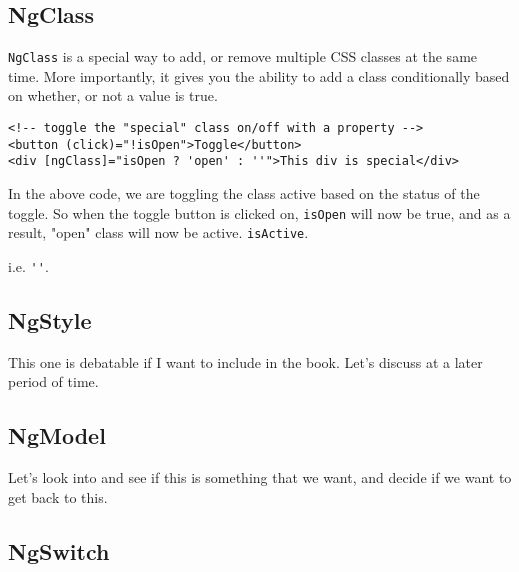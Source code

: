 \subsection{NgClass}
\lstinline{NgClass} is a special way to add, or remove multiple CSS classes 
at the same time. More importantly, it gives you the ability to add a class 
conditionally based on whether, or not a value is true. 
\begin{lstlisting}
<!-- toggle the "special" class on/off with a property -->
<button (click)="!isOpen">Toggle</button>
<div [ngClass]="isOpen ? 'open' : ''">This div is special</div>
\end{lstlisting}

In the above code, we are toggling the class active based on the status of 
the toggle. So when the toggle button is clicked on, \lstinline{isOpen} will 
now be true, and as a result, "open" class will now be active. 
\lstinline{isActive}. 

 i.e. \lstinline{''}. 

 \subsection{ NgStyle }
This one is debatable if I want to include in the book. Let's discuss at a
later period of time. 

\subsection{ NgModel }
Let's look into and see if this is something that we want, and decide if we 
want to get back to this. 

\subsection{ NgSwitch }

